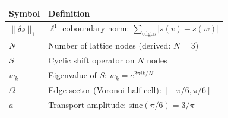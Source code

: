 \documentclass[
]{article}
\begin{document}
\begin{longtable}[]{@{}ll@{}}
\toprule
\begin{minipage}[b]{0.40\columnwidth}\raggedright
Symbol\strut
\end{minipage} & \begin{minipage}[b]{0.54\columnwidth}\raggedright
Definition\strut
\end{minipage}\tabularnewline
\midrule
\endhead
\begin{minipage}[t]{0.40\columnwidth}\raggedright
\(\|\delta s\|_1\)\strut
\end{minipage} & \begin{minipage}[t]{0.54\columnwidth}\raggedright
\(\ell^1\) coboundary norm: \(\sum_{\text{edges}} |s(v) - s(w)|\)\strut
\end{minipage}\tabularnewline
\begin{minipage}[t]{0.40\columnwidth}\raggedright
\(N\)\strut
\end{minipage} & \begin{minipage}[t]{0.54\columnwidth}\raggedright
Number of lattice nodes (derived: \(N = 3\))\strut
\end{minipage}\tabularnewline
\begin{minipage}[t]{0.40\columnwidth}\raggedright
\(S\)\strut
\end{minipage} & \begin{minipage}[t]{0.54\columnwidth}\raggedright
Cyclic shift operator on \(N\) nodes\strut
\end{minipage}\tabularnewline
\begin{minipage}[t]{0.40\columnwidth}\raggedright
\(w_k\)\strut
\end{minipage} & \begin{minipage}[t]{0.54\columnwidth}\raggedright
Eigenvalue of \(S\): \(w_k = e^{2\pi i k/N}\)\strut
\end{minipage}\tabularnewline
\begin{minipage}[t]{0.40\columnwidth}\raggedright
\(\Omega\)\strut
\end{minipage} & \begin{minipage}[t]{0.54\columnwidth}\raggedright
Edge sector (Voronoi half-cell): \([-\pi/6, \pi/6]\)\strut
\end{minipage}\tabularnewline
\begin{minipage}[t]{0.40\columnwidth}\raggedright
\(a\)\strut
\end{minipage} & \begin{minipage}[t]{0.54\columnwidth}\raggedright
Transport amplitude: \(\mathrm{sinc}(\pi/6) = 3/\pi\)\strut

\end{minipage}
\end{longtable}
\end{document}
